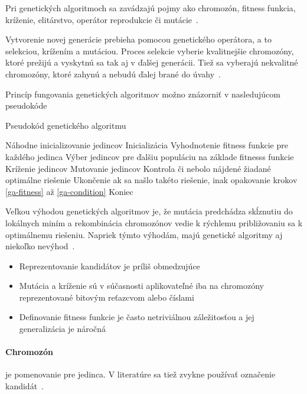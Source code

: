 \documentclass[a4paper,slovak,12pt,appendix]{article}
\begin{document}
Pri genetických algoritmoch sa zavádzajú pojmy ako chromozón, fitness funkcia,
kríženie, elitárstvo, operátor reprodukcie či mutácie~\cite{Chavan2015}.

Vytvorenie novej generácie prebieha pomocou genetického operátora,
a to selekciou, krížením a mutáciou. Proces selekcie vyberie kvalitnejšie
chromozóny, ktoré prežijú a vyskytnú sa tak aj v ďalšej generácii. Tiež sa
vyberajú nekvalitné chromozóny, ktoré zahynú a nebudú ďalej brané do
úvahy~\cite{Simonova2007}.

Princíp fungovania genetických algoritmov možno znázorniť v nasledujúcom
pseudokóde~\cite{Chavan2015}
\begin{algorithm}
  \caption{Pseudokód genetického algoritmu}
  \begin{algorithmic}[1]
    \State Náhodne inicializovanie jedincov Inicializácia
    \State Vyhodnotenie fitness funkcie pre každého jedinca \label{ga-fitness}
    \State Výber jedincov pre ďalšiu populáciu na základe fitnesss funkcie \label{ga-selection}
    \State Kríženie jedincov \label{ga-crossing}
    \State Mutovanie jedincov \label{ga-mutation}
    \State Kontrola či nebolo nájdené žiadané optimálne riešenie \label{ga-condition}
    \State Ukončenie ak sa našlo takéto riešenie, inak opakovanie krokov \ref{ga-fitness} až \ref{ga-condition}
    \State Koniec
  \end{algorithmic}
\end{algorithm}

Veľkou výhodou genetických algoritmov je, že mutácia predchádza skĺznutiu do
lokálnych miním a rekombinácia chromozónov vedie k rýchlemu približovaniu
sa k optimálnemu riešeniu. Napriek týmto výhodám, majú genetické algoritmy aj
niekoľko nevýhod~\cite{Deolekar2016}.
\begin{itemize}
  \item Reprezentovanie kandidátov je príliš obmedzujúce
  \item Mutácia a kríženie sú v súčasnosti aplikovateľné iba na chromozóny
        reprezentované bitovým reťazcvom alebo číslami
  \item Definovanie fitness funkcie je často netriviálnou záležitosťou
        a jej generalizácia je náročná
\end{itemize}

\paragraph{Chromozón} je pomenovanie pre jedinca. V literatúre sa tiež zvykne
používať označenie kandidát~\cite{Arun2016}.
\end{document}
